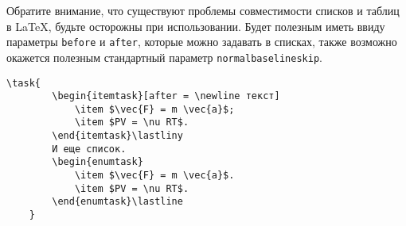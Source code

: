 \noindent
{}

\vspace{0.3cm}

Обратите внимание, что существуют проблемы совместимости списков и таблиц в \LaTeX, будьте осторожны при
использовании. Будет полезным иметь ввиду параметры \texttt{before} и \texttt{after}, которые можно
задавать в списках, также возможно окажется полезным стандартный параметр \texttt{normalbaselineskip}.

\begin{lstlisting}[gobble = 3]
    \task{
        \begin{itemtask}[after = \newline текст]
            \item $\vec{F} = m \vec{a}$;
            \item $PV = \nu RT$.
        \end{itemtask}\lastlinу
        И еще список.
        \begin{enumtask}
            \item $\vec{F} = m \vec{a}$.
            \item $PV = \nu RT$.
        \end{enumtask}\lastline
    }
\end{lstlisting}

\noindent
{}

